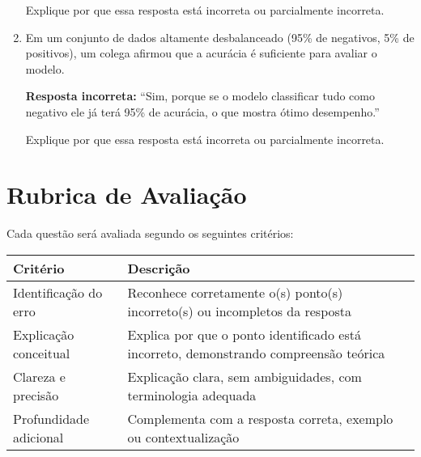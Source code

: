 \documentclass[12pt]{article}
\begin{document}
\begin{enumerate}
Explique por que essa resposta está incorreta ou parcialmente incorreta.

\item Em um conjunto de dados altamente desbalanceado (95\% de negativos, 5\% de positivos), um colega afirmou que a acurácia é suficiente para avaliar o modelo.

\textbf{Resposta incorreta:}  
“Sim, porque se o modelo classificar tudo como negativo ele já terá 95\% de acurácia, o que mostra ótimo desempenho.”  

Explique por que essa resposta está incorreta ou parcialmente incorreta.

\end{enumerate}

\section*{Rubrica de Avaliação}
Cada questão será avaliada segundo os seguintes critérios:

\begin{center}
\begin{tabular}{p{4.5cm}p{10cm}}
\toprule
\textbf{Critério} & \textbf{Descrição}  \\
\midrule
Identificação do erro & Reconhece corretamente o(s) ponto(s) incorreto(s) ou incompletos da resposta \\
Explicação conceitual & Explica por que o ponto identificado está incorreto, demonstrando compreensão teórica \\
Clareza e precisão & Explicação clara, sem ambiguidades, com terminologia adequada \\
Profundidade adicional & Complementa com a resposta correta, exemplo ou contextualização \\
\midrule
\bottomrule
\end{tabular}
\end{center}
\end{document}
